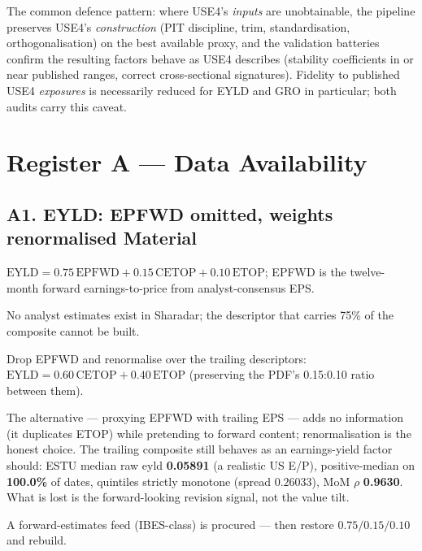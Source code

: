 \documentclass[11pt,a4paper]{article}
\newcommand{\WARN}[1]{\textcolor{warn}{\textbf{#1}}}
\begin{document}
The common defence pattern: where USE4's \emph{inputs} are unobtainable, the
pipeline preserves USE4's \emph{construction} (PIT discipline, trim,
standardisation, orthogonalisation) on the best available proxy, and the
validation batteries confirm the resulting factors behave as USE4 describes
(stability coefficients in or near published ranges, correct cross-sectional
signatures). Fidelity to published USE4 \emph{exposures} is necessarily reduced
for EYLD and GRO in particular; both audits carry this caveat.

\section{Register A --- Data Availability}

\subsection{A1. EYLD: EPFWD omitted, weights renormalised \hfill \WARN{Material}}

\begin{description}[style=nextline]
  \item[USE4] $\mathrm{EYLD} = 0.75\,\mathrm{EPFWD} + 0.15\,\mathrm{CETOP} +
    0.10\,\mathrm{ETOP}$; EPFWD is the twelve-month forward earnings-to-price
    from analyst-consensus EPS.
  \item[Deviation] No analyst estimates exist in Sharadar; the descriptor that
    carries 75\% of the composite cannot be built.
  \item[Solution] Drop EPFWD and renormalise over the trailing descriptors:
    $\mathrm{EYLD} = 0.60\,\mathrm{CETOP} + 0.40\,\mathrm{ETOP}$ (preserving the
    PDF's 0.15:0.10 ratio between them).
  \item[Validity] The alternative --- proxying EPFWD with trailing EPS --- adds
    no information (it duplicates ETOP) while pretending to forward content;
    renormalisation is the honest choice. The trailing composite still behaves
    as an earnings-yield factor should: ESTU median raw eyld \textbf{0.05891}
    (a realistic US E/P), positive-median on \textbf{100.0\%} of dates,
    quintiles strictly monotone (spread $0.26033$), MoM $\rho$ \textbf{0.9630}.
    What is lost is the forward-looking revision signal, not the value tilt.
  \item[Revisit when] A forward-estimates feed (IBES-class) is procured ---
    then restore $0.75/0.15/0.10$ and rebuild.
\end{description}
\end{document}
